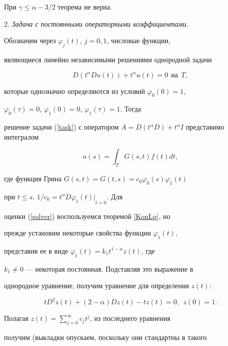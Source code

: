 \begin{notenonum}


При $\gamma \le \alpha-3/2$ теорема не верна.


\end{notenonum}





2. {\it Задача с постоянными операторными коэффициентами.}


Обозначим через $\varphi_j(t)$, $j=0,1$, числовые функции,


являющиеся линейно независимыми решениями однородной задачи


$$


D(t^\alpha D u(t)) + t^\alpha u(t)=0 \ \ \text{на} \ \ T,


$$


которые однозначно определяются из условий $\varphi_0(0)=1$,


$\varphi_0(\tau)=0$, $\varphi_1(0)=0$, $\varphi_1(\tau)=1$. Тогда


решение задачи (\ref{task}) с оператором $A=D(t^\alpha D)+t^\alpha


I$ представимо интегралом


\begin{equation}\label{solver}


u(s)=\int_T G(s,t) f(t) d t,


\end{equation}


где функция Грина $G(s,t)=G(t,s)=c_0 \varphi_0(s) \varphi_1(t)$


при $t \le s$, $1/c_0={t^\alpha D \varphi_1(t)|}_{t=0}$. Для


оценки (\ref{solver}) воспользуемся теоремой \ref{KonLp}, но


прежде установим некоторые свойства функции $\varphi_1(t)$,


представив ее в виде $\varphi_1(t)=k_1 t^{1-\alpha} z(t)$, где


$k_1 \ne 0$ --- некоторая постоянная. Подставляя это выражение в


однородное уравнение, получим уравнение для определения $z(t)$:


$$


tD^2z(t)+(2-\alpha)D z(t) - t z(t)=0, \ \ z(0)=1.


$$


Полагая $z(t)=\sum\limits_{j=0}^\infty c_j t^j$, из последнего уравнения


получим (выкладки опускаем, поскольку они стандартны в такого


